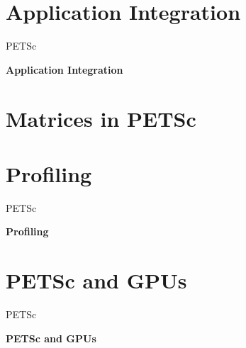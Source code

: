 






\section{Application Integration}
\begin{frame}{PETSc}
   \begin{center} \Large \textbf{Application Integration} \end{center}
\end{frame}








\section{Matrices in PETSc}








\section{Profiling}
\begin{frame}{PETSc}
   \begin{center} \Large \textbf{Profiling} \end{center}
\end{frame}







\section{PETSc and GPUs}
\begin{frame}{PETSc}
   \begin{center} \Large \textbf{PETSc and GPUs} \end{center}
\end{frame}

